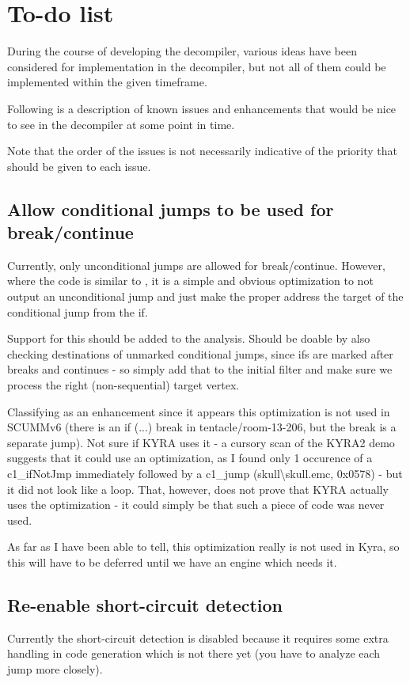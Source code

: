 \section{To-do list}
During the course of developing the decompiler, various ideas have been considered for implementation in the decompiler, but not all of them could be implemented within the given timeframe.

Following is a description of known issues and enhancements that would be nice to see in the decompiler at some point in time.

Note that the order of the issues is not necessarily indicative of the priority that should be given to each issue.

\subsection{Allow conditional jumps to be used for break/continue}
Currently, only unconditional jumps are allowed for break/continue. However, where the code is similar to , it is a simple and obvious optimization to not output an unconditional jump and just make the proper address the target of the conditional jump from the if.

Support for this should be added to the analysis. Should be doable by also checking destinations of unmarked conditional jumps, since ifs are marked after breaks and continues - so simply add that to the initial filter and make sure we process the right (non-sequential) target vertex.

Classifying as an enhancement since it appears this optimization is not used in SCUMMv6 (there is an if (...) break in tentacle/room-13-206, but the break is a separate jump). Not sure if KYRA uses it - a cursory scan of the KYRA2 demo suggests that it could use an optimization, as I found only 1 occurence of a c1\_ifNotJmp immediately followed by a c1\_jump (skull\textbackslash skull.emc, 0x0578) - but it did not look like a loop. That, however, does not prove that KYRA actually uses the optimization - it could simply be that such a piece of code was never used.

As far as I have been able to tell, this optimization really is not used in Kyra, so this will have to be deferred until we have an engine which needs it.

\subsection{Re-enable short-circuit detection}
Currently the short-circuit detection is disabled because it requires some extra handling in code generation which is not there yet (you have to analyze each jump more closely).

